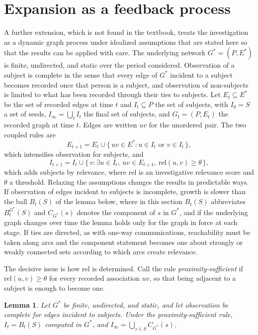 \documentclass[11pt]{article}
\newtheorem{lemma}{Lemma}
\theoremstyle{definition}
\theoremstyle{remark}
\begin{document}
\section{Expansion as a feedback process}

A further extension, which is not found in the textbook, treats the investigation as a dynamic graph process under idealized assumptions that are stated here so that the results can be applied with care. The underlying network $G^{\ast} = (P, E^{\ast})$ is finite, undirected, and static over the period considered. Observation of a subject is complete in the sense that every edge of $G^{\ast}$ incident to a subject becomes recorded once that person is a subject, and observation of non-subjects is limited to what has been recorded through their ties to subjects. Let $E_t \subseteq E^{\ast}$ be the set of recorded edges at time $t$ and $I_t \subseteq P$ the set of subjects, with $I_0 = S$ a set of seeds, $I_\infty = \bigcup_t I_t$ the final set of subjects, and $G_t = (P, E_t)$ the recorded graph at time $t$. Edges are written $uv$ for the unordered pair. The two coupled rules are
\[
E_{t+1} = E_t \cup \{\, uv \in E^{\ast} : u \in I_t \text{ or } v \in I_t \,\},
\]
which intensifies observation for subjects, and
\[
I_{t+1} = I_t \cup \{\, v : \exists u \in I_t,\ uv \in E_{t+1},\ \mathrm{rel}(u,v) \ge \theta \,\},
\]
which adds subjects by relevance, where $\mathrm{rel}$ is an investigative relevance score and $\theta$ a threshold. Relaxing the assumptions changes the results in predictable ways. If observation of edges incident to subjects is incomplete, growth is slower than the ball $B_t(S)$ of the lemma below, where in this section $B_t(S)$ abbreviates $B_t^{G^{\ast}}(S)$ and $C_{G^{\ast}}(s)$ denotes the component of $s$ in $G^{\ast}$, and if the underlying graph changes over time the lemma holds only for the graph in force at each stage. If ties are directed, as with one-way communications, reachability must be taken along arcs and the component statement becomes one about strongly or weakly connected sets according to which arcs create relevance.

The decisive issue is how $\mathrm{rel}$ is determined. Call the rule \emph{proximity-sufficient} if $\mathrm{rel}(u,v) \ge \theta$ for every recorded association $uv$, so that being adjacent to a subject is enough to become one.

\begin{lemma}
Let $G^{\ast}$ be finite, undirected, and static, and let observation be complete for edges incident to subjects. Under the proximity-sufficient rule, $I_t = B_t(S)$ computed in $G^{\ast}$, and $I_\infty = \bigcup_{s \in S} C_{G^{\ast}}(s)$.
\end{lemma}
\end{document}
